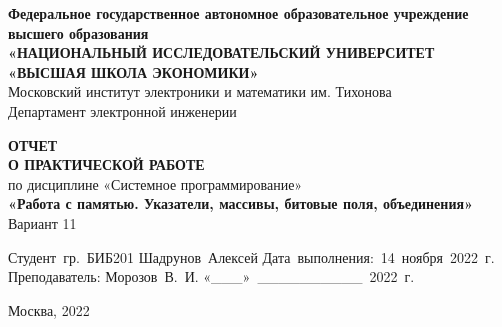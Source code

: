 
\begin{titlepage}
    \begin{Times}
        \begin{center}

            {\large\bf Федеральное‌ ‌государственное‌ ‌автономное‌ ‌образовательное‌ ‌учреждение‌ ‌высшего‌ образования\\}
            {\large\bf «НАЦИОНАЛЬНЫЙ‌ ‌ИССЛЕДОВАТЕЛЬСКИЙ‌ ‌УНИВЕРСИТЕТ‌ «ВЫСШАЯ‌ ‌ШКОЛА‌ ‌ЭКОНОМИКИ»‌\\}
            Московский‌ ‌институт‌ ‌электроники‌ ‌и‌ ‌математики‌ ‌им. Тихонова‌\\
            Департамент‌ ‌электронной‌ ‌инженерии‌\\

            \vfill
            \vfill

            {\bf ОТЧЕТ \\
                О ПРАКТИЧЕСКОЙ РАБОТЕ}\\
            по дисциплине «Системное программирование»\\
            {\bf«Работа с памятью. Указатели, массивы, битовые поля, объединения»}\\
            Вариант 11\\


            \vfill
            \vfill
            \vfill

            \hfill\vbox
            {
                \hbox{Студент гр. БИБ201}
                \hbox{Шадрунов Алексей}
                \hbox{Дата выполнения: 14 ноября 2022 г.}
                \hbox{}
                \hbox{Преподаватель:}
                \hbox{Морозов В. И.}
                \hbox{«\_\_\_» \_\_\_\_\_\_\_\_\_\_ 2022 г.}
            }

            \vfill

            Москва, 2022
        \end{center}
    \end{Times}

\end{titlepage}
